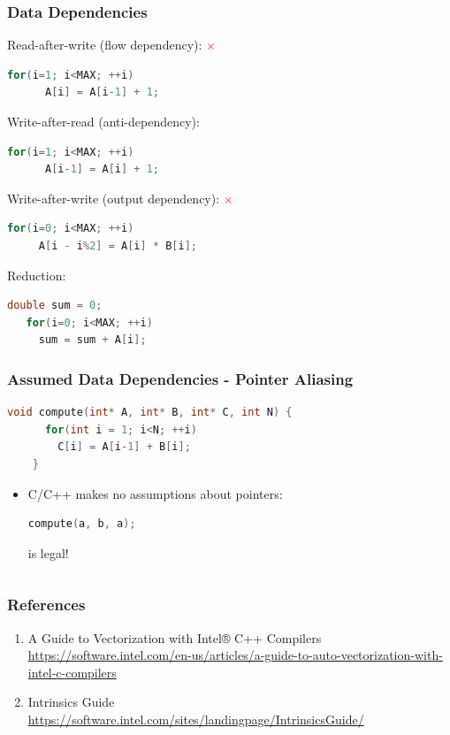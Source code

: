\documentclass{beamer}
\begin{document}
\begin{frame}[fragile]
  \frametitle{Data Dependencies}
  Read-after-write (flow dependency): \textcolor{red}{$\times$}
  \begin{lstlisting}[language=C++]
    for(i=1; i<MAX; ++i) 
      A[i] = A[i-1] + 1;
  \end{lstlisting}
  Write-after-read (anti-dependency): \textcolor{green}{\checkmark}
  \begin{lstlisting}[language=C++]
    for(i=1; i<MAX; ++i) 
      A[i-1] = A[i] + 1;
  \end{lstlisting}
  Write-after-write (output dependency): \textcolor{red}{$\times$}
  \begin{lstlisting}[language=C++]
   for(i=0; i<MAX; ++i)
     A[i - i%2] = A[i] * B[i]; 
  \end{lstlisting}
  Reduction: \textcolor{green}{\checkmark}
  \begin{lstlisting}[language=C++]
   double sum = 0;
   for(i=0; i<MAX; ++i)
     sum = sum + A[i];
  \end{lstlisting}
\end{frame}

\begin{frame}[fragile]
  \frametitle{Assumed Data Dependencies - Pointer Aliasing}
  \begin{lstlisting}[language=C++]
    void compute(int* A, int* B, int* C, int N) {
      for(int i = 1; i<N; ++i) 
        C[i] = A[i-1] + B[i];
    }
  \end{lstlisting}
  
  \begin{itemize}
   \item C/C++ makes no assumptions about pointers:
   \begin{lstlisting}[language=C++]
      compute(a, b, a);
  \end{lstlisting}
  is legal!
  \end{itemize}

  
  
  \begin{lstlisting}[language=C++]

  \end{lstlisting}
\end{frame}

\begin{frame} 
 \frametitle{References}
 \begin{enumerate}
  \item A Guide to Vectorization with Intel® C++ Compilers \\ \small{\textcolor{gray}{\url{https://software.intel.com/en-us/articles/a-guide-to-auto-vectorization-with-intel-c-compilers}}}
  \item \Intel Intrinsics Guide \\ \small{\textcolor{gray}{\url{https://software.intel.com/sites/landingpage/IntrinsicsGuide/}}}
 \end{enumerate}

 

\end{frame}
\end{document}
